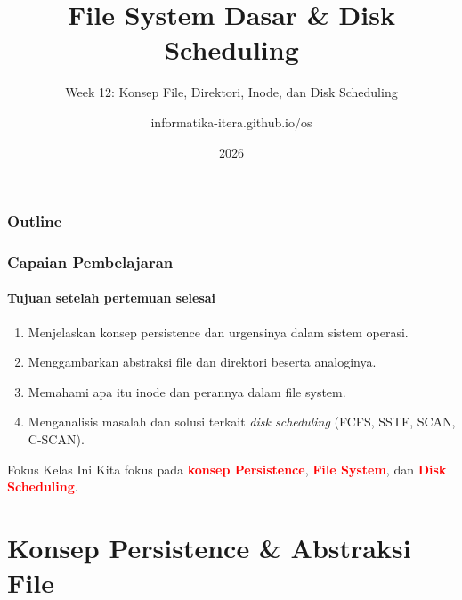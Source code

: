 \documentclass[t,aspectratio=169,xcolor=dvipsnames]{beamer}
\title[File System Dasar]{File System Dasar \& Disk Scheduling}
\subtitle{Week 12: Konsep File, Direktori, Inode, dan Disk Scheduling}
\author[informatika-itera.github.io/os]{informatika-itera.github.io/os}
\institute[ITERA]{Program Studi Teknik Informatika \\ Institut Teknologi Sumatera}
\date{\textcolor{nyublue}{2026}}
\newcommand{\tem}[1]{\textbf{\textcolor{red}{#1}}}
\begin{document}
\begin{frame}
    \titlepage
\end{frame}

\begin{frame}
    \frametitle{Outline}
    \tableofcontents
\end{frame}

\begin{frame}
    \frametitle{Capaian Pembelajaran}
    \framesubtitle{Tujuan setelah pertemuan selesai}
    \small
    \begin{enumerate}
        \item Menjelaskan konsep persistence dan urgensinya dalam sistem operasi.
        \item Menggambarkan abstraksi file dan direktori beserta analoginya.
        \item Memahami apa itu inode dan perannya dalam file system.
        \item Menganalisis masalah dan solusi terkait \textit{disk scheduling} (FCFS, SSTF, SCAN, C-SCAN).
    \end{enumerate}
    \vspace{0.5cm}
    \begin{exampleblock}{Fokus Kelas Ini}
        Kita fokus pada \tem{konsep Persistence}, \tem{File System}, dan \tem{Disk Scheduling}.
    \end{exampleblock}
\end{frame}

\section{Konsep Persistence \& Abstraksi File}
\end{document}

